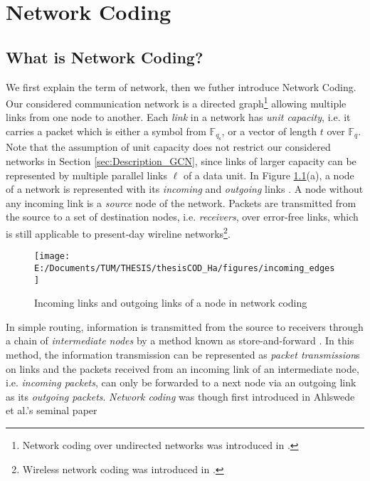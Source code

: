 \chapter{Network Coding} \label{chap:network_coding}

\section{What is Network Coding? \label{sec:What-is-NC}}

We first explain the term of network, then we futher introduce Network
Coding. Our considered communication network is a directed graph\footnote{Network coding over undirected networks was introduced in \cite{Li:2004}.}
allowing multiple links from one node to another. Each \textit{link}
in a network has \textit{unit capacity}, i.e. it carries a packet
which is either a symbol from $\ensuremath{\mathbb{F}}_{q_{\mathrm{s}}}$,
or a vector of length $t$ over $\ensuremath{\mathbb{F}}_{q}$. Note
that the assumption of unit capacity does not restrict our considered
networks in Section \ref{sec:Description_GCN}, since links of larger
capacity can be represented by multiple parallel links $\ell$ of
a data unit. In Figure \ref{fig:incoming_links}(a), a node of a network
is represented with its \textit{incoming} and \textit{outgoing }links
. A node without any incoming link is a \textit{source} node of the
network. Packets are transmitted from the source to a set of destination
nodes, i.e. \textit{receivers}, over error-free links, which is still
applicable to present-day wireline networks\footnote{Wireless network coding was introduced in \cite{Katti:2008}.}.
\begin{figure}[H]
\caption{Incoming links and outgoing links of a node in network coding \label{fig:incoming_links}}

\centering{}\texttt{[image: E:/Documents/TUM/THESIS/thesisCOD\_Ha/figures/incoming\_edges]}
\end{figure}
In simple routing, information is transmitted from the source to receivers
through a chain of \textit{intermediate nodes} by a method known as
store-and-forward \cite{Yeung:2006}. In this method, the information
transmission can be represented as \textit{packet transmission}s on
links and the packets received from an incoming link of an intermediate
node, i.e. \textit{incoming packets}, can only be forwarded to a next
node via an outgoing link as its \textit{outgoing packets}. \textit{Network
coding} was though first introduced in Ahlswede et al.'s seminal paper
